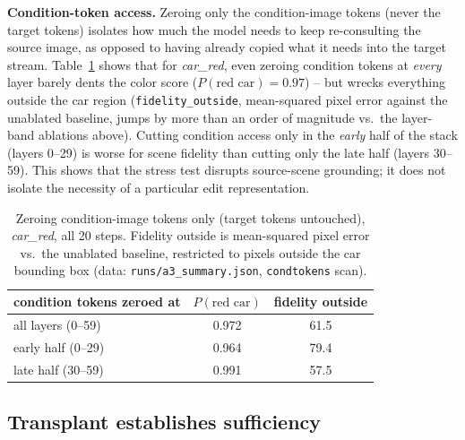 \documentclass[10pt,twocolumn,letterpaper]{article}
\begin{document}
\textbf{Condition-token access.} Zeroing only the condition-image
tokens (never the target tokens) isolates how much the model needs to
keep re-consulting the source image, as opposed to having already
copied what it needs into the target stream. Table~\ref{tab:condtok}
shows that for \emph{car\_red}, even zeroing condition tokens at
\emph{every} layer barely dents the color score ($P(\text{red
car})=0.97$) -- but wrecks everything outside the car region
(\texttt{fidelity\_outside}, mean-squared pixel error against the
unablated baseline, jumps by more than an order of magnitude vs.\ the
layer-band ablations above). Cutting condition access only in the
\emph{early} half of the stack (layers 0--29) is worse for scene
fidelity than cutting only the late half (layers 30--59). This shows
that the stress test disrupts source-scene grounding; it does not isolate
the necessity of a particular edit representation.

\begin{table}[t]
\centering
\small
\begin{tabular}{lcc}
\toprule
condition tokens zeroed at & $P(\text{red car})$ & fidelity outside \\
\midrule
all layers (0--59)   & 0.972 & 61.5 \\
early half (0--29)   & 0.964 & 79.4 \\
late half (30--59)   & 0.991 & 57.5 \\
\bottomrule
\end{tabular}
\caption{Zeroing condition-image tokens only (target tokens untouched),
\emph{car\_red}, all 20 steps. Fidelity outside is mean-squared pixel
error vs.\ the unablated baseline, restricted to pixels outside the car
bounding box (data: \texttt{runs/a3\_summary.json}, \texttt{condtokens}
scan).}
\label{tab:condtok}
\end{table}
\subsection{Transplant establishes sufficiency}\label{sec:swap}
\end{document}

